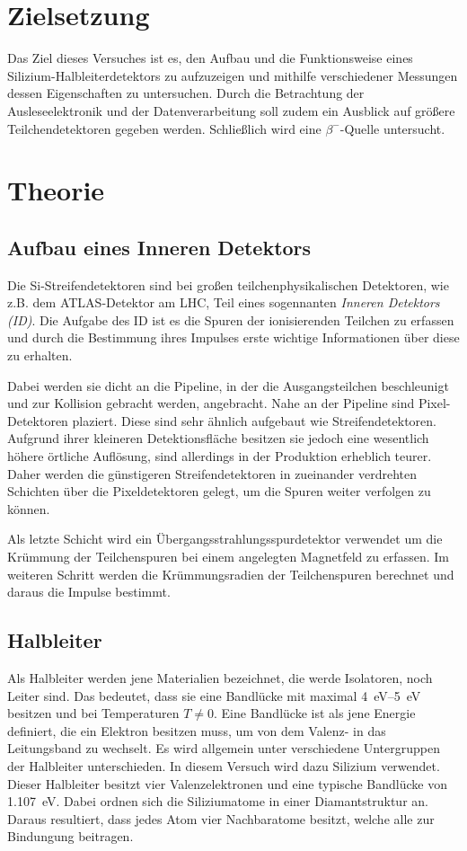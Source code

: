 \section{Zielsetzung}
\label{sec:Zielsetzung}

Das Ziel dieses Versuches ist es, den Aufbau und die Funktionsweise eines
Silizium-Halbleiterdetektors zu aufzuzeigen und mithilfe verschiedener Messungen dessen
Eigenschaften zu untersuchen. Durch die Betrachtung der Ausleseelektronik und
der Datenverarbeitung soll zudem ein Ausblick auf größere Teilchendetektoren
gegeben werden. Schließlich wird eine $\beta^{-}$-Quelle untersucht.

\section{Theorie}
\label{sec:Theorie}
\subsection{Aufbau eines Inneren Detektors}

Die Si-Streifendetektoren sind bei großen teilchenphysikalischen Detektoren,
wie z.B. dem ATLAS-Detektor am LHC, Teil eines sogennanten \textit{Inneren Detektors (ID)}.
Die Aufgabe des ID ist es die Spuren der ionisierenden Teilchen zu erfassen und
durch die Bestimmung ihres Impulses erste wichtige Informationen über diese zu
erhalten.

Dabei werden sie dicht an die Pipeline, in der die Ausgangsteilchen beschleunigt und
zur Kollision gebracht werden, angebracht. Nahe an der Pipeline sind Pixel-Detektoren plaziert.
Diese sind sehr ähnlich aufgebaut wie Streifendetektoren. Aufgrund ihrer kleineren
Detektionsfläche besitzen sie jedoch eine wesentlich höhere örtliche Auflösung, sind
allerdings in der Produktion erheblich teurer. Daher werden die günstigeren
Streifendetektoren in zueinander verdrehten Schichten über die Pixeldetektoren
gelegt, um die Spuren weiter verfolgen zu können.

Als letzte Schicht wird ein Übergangsstrahlungsspurdetektor verwendet um die
Krümmung der Teilchenspuren bei einem angelegten Magnetfeld zu
erfassen. Im weiteren Schritt werden die Krümmungsradien der Teilchenspuren
berechnet und daraus die Impulse bestimmt.

\subsection{Halbleiter}
Als Halbleiter werden jene Materialien bezeichnet, die werde Isolatoren, noch Leiter
sind. Das bedeutet, dass sie eine Bandlücke mit maximal \SIrange{4}{5}{\electronvolt}
besitzen und bei Temperaturen $T \neq 0$. Eine Bandlücke ist
als jene Energie definiert, die ein Elektron besitzen muss, um von dem Valenz-
in das Leitungsband zu wechselt. Es wird allgemein unter verschiedene
Untergruppen der Halbleiter unterschieden.
In diesem Versuch wird dazu Silizium verwendet. Dieser Halbleiter besitzt vier
Valenzelektronen und eine typische Bandlücke von \SI{1.107}{\electronvolt}.
 Dabei ordnen sich die Siliziumatome in einer Diamantstruktur an. Daraus
 resultiert, dass jedes Atom vier Nachbaratome besitzt, welche alle zur Bindungung
 beitragen.

